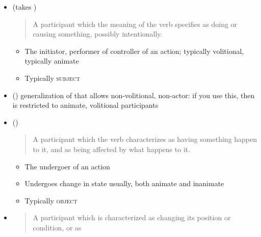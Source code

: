 \documentclass[headrule,footrule]{foils}
\begin{document}
\begin{itemize}
\item {} (takes )
  \begin{quote}
    A participant which the meaning of the verb specifies as doing or causing something,
    possibly intentionally. 
  \end{quote}
  \begin{itemize}
  \item The initiator, performer of controller of an action; typically volitional, typically animate
  \item Typically \textsc{subject}
  \end{itemize}
  \begin{exe}
      \ex{}
      \ex{}
      \ex{}
    \end{exe}
\item () generalization of  that allows non-volitional, non-actor:
   if you use this, then  is restricted to animate, volitional participants
\newpage
\item  {} ()
  \begin{quote}
    A participant which the verb characterizes as having something
    happen to it, and as being affected by what happens to it.
  \end{quote}
  \begin{itemize}
  \item The undergoer of an action
  \item  Undergoes change in state usually, both animate and 
    inanimate
  \item Typically \textsc{object}
  \end{itemize}
  \begin{exe}
    \ex{}
    \ex{}
    \ex{}
    \ex{}
  \end{exe}
\newpage
\item  {}
  \begin{quote}
     A participant which is characterized as changing its position or condition, or as

\end{quote}
\end{itemize}
\end{document}
